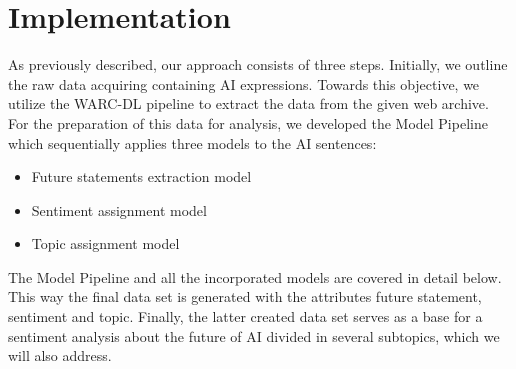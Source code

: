 \section{Implementation}
As previously described, our approach consists of three steps.
Initially, we outline the raw data acquiring containing AI expressions.
Towards this objective, we utilize the WARC-DL pipeline \citep{Deckers2022} to extract the data from the given web archive.
For the preparation of this data for analysis, we developed the Model Pipeline which sequentially applies three models to the AI sentences:
\begin{itemize}
    \item Future statements extraction model
    \item Sentiment assignment model
    \item Topic assignment model
\end{itemize}
The Model Pipeline and all the incorporated models are covered in detail below. This way the final data set is generated with the attributes future statement, sentiment and topic.
Finally, the latter created data set serves as a base for a sentiment analysis about the future of AI divided in several subtopics, which we will also address.

